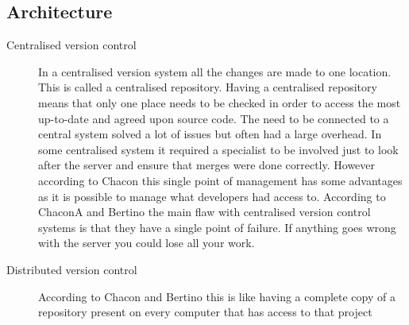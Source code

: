 % 

\subsection{Architecture}
\begin{description}

  \item [Centralised version control] 
  In a centralised version system all the changes are made to one location.  This is called a centralised repository. Having a centralised repository means that only one place needs to be checked in order to access the most up-to-date and agreed upon source code. The need to be connected to a central system solved a lot of issues but often had a large overhead.  In some centralised system it required a specialist to be involved just to look after the server and ensure that merges were done correctly. However according to Chacon \cite{Chacon2009} this single point of management has some advantages as it is possible to manage what developers had access to. According to ChaconA \cite{Chacon2009} and Bertino \cite{Bertino2012} the main flaw with centralised version control systems is that they have a single point of failure. If anything goes wrong with the server you could lose all your work.

  \item [Distributed version control] 
  According to Chacon \cite{Chacon2009} and Bertino \cite{Bertino2012} this is like having a complete copy of a repository present on every computer that has access to that project


\end{description}
